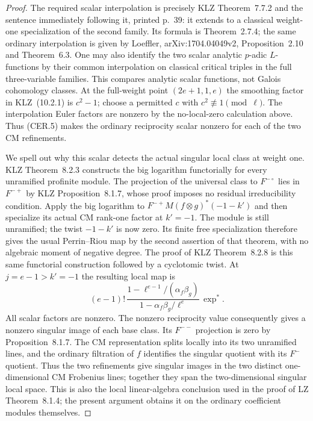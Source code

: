 \begin{proof}
The required scalar interpolation is precisely KLZ
Theorem~7.7.2 and the sentence immediately following it,
printed p.~39: it extends to a classical weight-one
specialization of the second family.  Its formula is
Theorem~2.7.4; the same ordinary interpolation is given by
Loeffler, arXiv:1704.04049v2, Proposition~2.10 and
Theorem~6.3.  One may also identify the two scalar analytic
$p$-adic $L$-functions by their common interpolation on
classical critical triples in the full three-variable
families.  This compares analytic scalar functions, not
Galois cohomology classes.
At the full-weight point $(2e+1,1,e)$ the smoothing factor
in KLZ~(10.2.1) is $c^2-1$; choose a permitted $c$ with
$c^2\not\equiv1\pmod\ell$.  The interpolation Euler factors
are nonzero by the no-local-zero calculation above.
Thus (CER.5) makes the ordinary reciprocity scalar nonzero
for each of the two CM refinements.

We spell out why this scalar detects the actual singular
local class at weight one.  KLZ Theorem~8.2.3 constructs
the big logarithm functorially for every unramified
profinite module.  The projection of the universal class
to $F^{-\circ}$ lies in $F^{-+}$ by KLZ
Proposition~8.1.7, whose proof imposes no residual
irreducibility condition.  Apply the big logarithm to
$F^{-+}M(f\otimes g)^*(-1-k')$ and then specialize its
actual CM rank-one factor at $k'=-1$.
The module is still unramified; the twist $-1-k'$ is now
zero.  Its finite free specialization therefore gives the
usual Perrin--Riou map by the second assertion of that
theorem, with no algebraic moment of negative degree.
The proof of KLZ Theorem~8.2.8 is this same functorial
construction followed by a cyclotomic twist.  At
$j=e-1>k'=-1$ the resulting local map is
\[
 (e-1)!\,
 \frac{1-\ell^{e-1}/(\alpha_f\beta_g)}
      {1-\alpha_f\beta_g/\ell^e}\,\exp^*.
                                                            \tag{CER.5a}
\]
All scalar factors are nonzero.  The nonzero reciprocity
value consequently gives a nonzero singular image of each
base class.  Its $F^{--}$ projection is zero by
Proposition~8.1.7.  The CM representation splits locally
into its two unramified lines, and the ordinary filtration
of $f$ identifies the singular quotient with its
$F^-$ quotient.  Thus the two refinements give singular
images in the two distinct one-dimensional CM Frobenius
lines; together they span the two-dimensional singular
local space.  This is also the
local linear-algebra conclusion used in the proof of LZ
Theorem~8.1.4; the present argument obtains it on the
ordinary coefficient modules themselves.


\end{proof}
